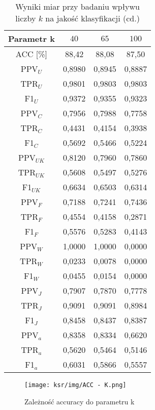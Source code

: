 \documentclass{article}
\begin{document}
\begin{table}[H]
    \centering
    \begin{tabular}{|c|c|c|c|}
    \hline
    \textbf{Parametr k} & \textbf{\(40\)} & \textbf{\(65\)} & \textbf{\(100\)}\\ \hline
    ACC [\%]  & 88,42 & 88,08 & 87,50\\ \hline
    PPV\(_U\) & 0,8980& 0,8945 & 0,8887\\ \hline
    TPR\(_U\) & 0,9801& 0,9803 & 0,9803\\ \hline
    F1\(_U\) & 0,9372& 0,9355& 0,9323\\ \hline
    PPV\(_C\) & 0,7956& 0,7988& 0,7758\\ \hline
    TPR\(_C\) & 0,4431& 0,4154& 0,3938\\ \hline
    F1\(_C\) & 0,5692& 0,5466& 0,5224\\ \hline
    PPV\(_{UK}\) & 0,8120& 0,7960& 0,7860\\ \hline
    TPR\(_{UK}\) & 0,5608& 0,5497& 0,5276\\ \hline
    F1\(_{UK}\) & 0,6634& 0,6503& 0,6314\\ \hline
    PPV\(_F\) & 0,7188& 0,7241 & 0,7436\\ \hline
    TPR\(_F\) & 0,4554& 0,4158 & 0,2871\\ \hline
    F1\(_F\) & 0,5576& 0,5283 & 0,4143\\ \hline
    PPV\(_W\) & 1,0000& 1,0000 & 0,0000\\ \hline
    TPR\(_W\) & 0,0233& 0,0078& 0,0000\\ \hline
    F1\(_W\) & 0,0455& 0,0154& 0,0000\\ \hline
    PPV\(_J\) & 0,7907& 0,7870& 0,7778\\ \hline
    TPR\(_J\) & 0,9091& 0,9091& 0,8984\\ \hline
    F1\(_J\) & 0,8458& 0,8437& 0,8387\\ \hline
    PPV\(_a\) & 0,8358 & 0,8334 & 0,6620\\ \hline
    TPR\(_a\) & 0,5620 & 0,5464 & 0,5146\\ \hline
    F1\(_a\) & 0,6031 & 0,5866 & 0,5557\\ \hline
    \end{tabular}
    \caption{Wyniki miar przy badaniu wpływu liczby \(k\) na jakość klasyfikacji (cd.)}
\end{table}
\begin{figure}[H]
    \centering
    \texttt{[image: ksr/img/ACC - K.png]}
    \caption{Zależność accuracy do parametru k}
    \label{fig:moj-obraz}
\end{figure}
\end{document}
